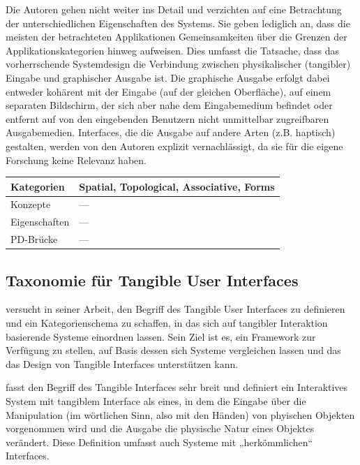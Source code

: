 Die Autoren gehen nicht weiter ins Detail und verzichten auf eine Betrachtung der unterschiedlichen Eigenschaften des Systems. Sie geben lediglich an, dass die meisten der betrachteten Applikationen Gemeinsamkeiten über die Grenzen der Applikationskategorien hinweg aufweisen. Dies umfasst die Tatsache, dass das vorherrschende Systemdesign die Verbindung zwischen physikalischer (tangibler) Eingabe und graphischer Ausgabe ist. Die graphische Ausgabe erfolgt dabei entweder kohärent mit der Eingabe (auf der gleichen Oberfläche), auf einem separaten Bildschirm, der sich aber nahe dem Eingabemedium befindet oder entfernt auf von den eingebenden Benutzern nicht unmittelbar zugreifbaren Ausgabemedien. Interfaces, die die Ausgabe auf andere Arten (z.B. haptisch) gestalten, werden von den Autoren explizit vernachlässigt, da sie für die eigene Forschung keine Relevanz haben.
\\[1em]
\begin{tabular}{| p{3cm} | p{10cm} |}
  \hline
  Kategorien & Spatial, Topological, Associative, Forms \\ \hline
  Konzepte & --- \\ \hline
  Eigenschaften & --- \\ \hline
  PD-Brücke & --- \\ \hline
\end{tabular} 


\subsection{Taxonomie für Tangible User Interfaces} %
\label{sub:taxonomie_fishkin}

\citet{Fishkin04} versucht in seiner Arbeit, den Begriff des Tangible User Interfaces zu definieren und ein Kategorienschema zu schaffen, in das sich auf tangibler Interaktion basierende Systeme einordnen lassen. Sein Ziel ist es, ein Framework zur Verfügung zu stellen, auf Basis dessen sich Systeme vergleichen lassen und das das Design von Tangible Interfaces unterstützen kann.

\citeauthor{Fishkin04} fasst den Begriff des Tangible Interfaces sehr breit und definiert ein Interaktives System mit tangiblem Interface als eines, in dem die Eingabe über die Manipulation (im wörtlichen Sinn, also mit den Händen) von phyischen Objekten vorgenommen wird und die Ausgabe die physische Natur eines Objektes verändert. Diese Definition umfasst auch Systeme mit „herkömmlichen“ Interfaces.


